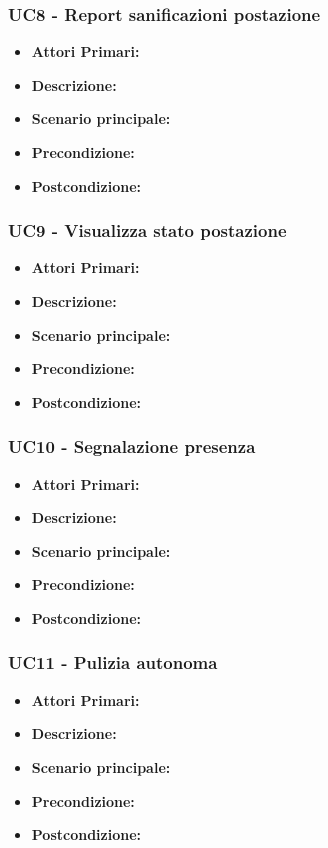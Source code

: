 \subsubsection{ UC8 - Report sanificazioni postazione}
\begin{itemize}
           	\item\textbf{Attori Primari:} 
           	\item\textbf{Descrizione:} 
           	\item\textbf{Scenario principale:} 
           	\item\textbf{Precondizione:} 
           	\item\textbf{Postcondizione:}
\end{itemize}

\subsubsection{ UC9 - Visualizza stato postazione}
\begin{itemize}
           	\item\textbf{Attori Primari:} 
           	\item\textbf{Descrizione:} 
           	\item\textbf{Scenario principale:} 
           	\item\textbf{Precondizione:} 
           	\item\textbf{Postcondizione:}
\end{itemize}

\subsubsection{ UC10 - Segnalazione presenza}
\begin{itemize}
           	\item\textbf{Attori Primari:} 
           	\item\textbf{Descrizione:} 
           	\item\textbf{Scenario principale:} 
           	\item\textbf{Precondizione:} 
           	\item\textbf{Postcondizione:}
\end{itemize}

\subsubsection{ UC11 - Pulizia autonoma}
\begin{itemize}
           	\item\textbf{Attori Primari:} 
           	\item\textbf{Descrizione:} 
           	\item\textbf{Scenario principale:} 
           	\item\textbf{Precondizione:} 
           	\item\textbf{Postcondizione:}
\end{itemize}

